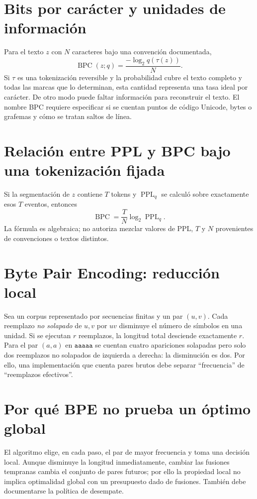 \documentclass[11pt,a4paper]{report}
\begin{document}
\section{Bits por carácter y unidades de información}
Para el texto $z$ con $N$ caracteres bajo una convención documentada,
\[
\operatorname{BPC}(z;q)=\frac{-\log_2q(\tau(z))}{N}.
\]
Si $\tau$ es una tokenización reversible y la probabilidad cubre el texto
completo y todas las marcas que lo determinan, esta cantidad representa
una tasa ideal por carácter. De otro modo puede faltar información para
reconstruir el texto. El nombre BPC requiere especificar si se cuentan
puntos de código Unicode, bytes o grafemas y cómo se tratan saltos de línea.
\section{Relación entre PPL y BPC bajo una tokenización fijada}
Si la segmentación de $z$ contiene $T$ tokens y $\operatorname{PPL}_q$
se calculó sobre exactamente esos $T$ eventos, entonces
\[
\operatorname{BPC}=\frac{T}{N}\log_2\operatorname{PPL}_q.
\]
La fórmula es algebraica; no autoriza mezclar valores de PPL, $T$ y $N$
provenientes de convenciones o textos distintos.
\section{Byte Pair Encoding: reducción local}
Sea un corpus representado por secuencias finitas y un par $(u,v)$.
Cada reemplazo \emph{no solapado} de $u,v$ por $uv$ disminuye
el número de símbolos en una unidad. Si se ejecutan $r$ reemplazos,
la longitud total desciende exactamente $r$. Para el par $(a,a)$ en
$\texttt{aaaaa}$ se cuentan cuatro apariciones solapadas pero solo dos
reemplazos no solapados de izquierda a derecha: la disminución es dos.
Por ello, una implementación que cuenta pares brutos debe separar
``frecuencia'' de ``reemplazos efectivos''.
\section{Por qué BPE no prueba un óptimo global}
El algoritmo elige, en cada paso, el par de mayor frecuencia y toma una
decisión local. Aunque disminuye la longitud inmediatamente, cambiar las
fusiones tempranas cambia el conjunto de pares futuros; por ello la
propiedad local no implica optimalidad global con un presupuesto dado de
fusiones. También debe documentarse la política de desempate.
\end{document}
